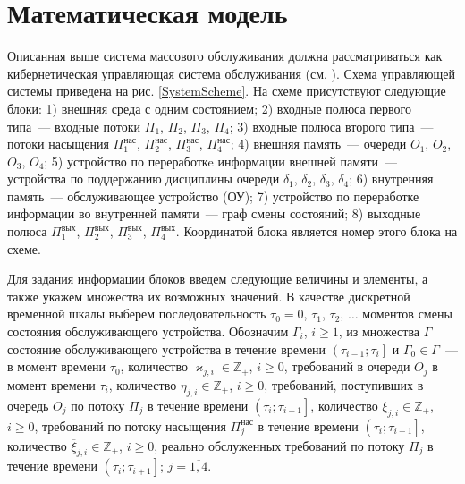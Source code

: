 \documentclass[11pt]{ubs}
\begin{document}
\section{Математическая модель}

Описанная выше система массового обслуживания должна рассматриваться как кибернетическая управляющая система обслуживания (см. \cite{Zorine:2011:2}). Схема управляющей системы приведена на рис. \ref{SystemScheme}. На схеме присутствуют следующие блоки: 1) внешняя среда с одним состоянием; 2) входные полюса первого типа~--- входные потоки $\Pi_1$, $\Pi_2$, $\Pi_3$, $\Pi_4$; 3) входные полюса второго типа~--- потоки насыщения $\Pi_1^{\mathrm{\text{нас}}}$, $\Pi_2^{\mathrm{\text{нас}}}$, $\Pi_3^{\mathrm{\text{нас}}}$, $\Pi_4^{\mathrm{\text{нас}}}$; 4) внешняя память~--- очереди $O_1$, $O_2$, $O_3$, $O_4$; 5) устройство по переработкe информации внешней памяти~--- устройства по поддержанию дисциплины очереди $\delta_1$, $\delta_2$, $\delta_3$, $\delta_4$; 6) внутренняя память~--- обслуживающее устройство (ОУ); 7) устройство по переработке информации во внутренней памяти~--- граф смены состояний; 8) выходные полюса $\Pi_1^{\mathrm{\text{вых}}}$, $\Pi_2^{\mathrm{\text{вых}}}$, $\Pi_3^{\mathrm{\text{вых}}}$, $\Pi_4^{\mathrm{\text{вых}}}$. Координатой блока является номер этого блока на схеме. 

Для задания информации блоков введем следующие величины и элементы, а также укажем множества их возможных значений. В качестве дискретной временной шкалы выберем последовательность $\tau_0=0$, $\tau_1$, $\tau_2$, $\ldots$ моментов смены состояния обслуживающего устройства. Обозначим $\Gamma_i$, $i\geqslant 1$, из множества $\Gamma$ состояние обслуживающего устройства в течение времени $\left(\tau_{i-1};\tau_i\right]$ и $\Gamma_0\in \Gamma$~--- в момент времени $\tau_0$, количество $\varkappa_{j,i} \in \mathbb{Z}_+ $, $i\geqslant 0$, требований в очереди $O_j$ в момент времени $\tau_i$, количество $\eta_{j,i} \in \mathbb{Z}_+$, $i\geqslant 0$, требований, поступивших в очередь $O_j$ по потоку $\Pi_j$ в течение времени $\left(\tau_{i};\tau_{i+1}\right]$, количество $\xi_{j,i} \in \mathbb{Z}_+$, $i\geqslant 0$, требований по потоку насыщения $\Pi^{\mathrm{\text{нас}}}_j$ в течение времени $\left(\tau_{i};\tau_{i+1}\right]$, количество $\overline{\xi}_{j,i}\in \mathbb{Z}_+$, $i\geqslant 0$, реально обслуженных требований по потоку $\Pi_j$ в течение времени $\left(\tau_{i};\tau_{i+1}\right]$; $j=\overline{1,4}$.
\end{document}
